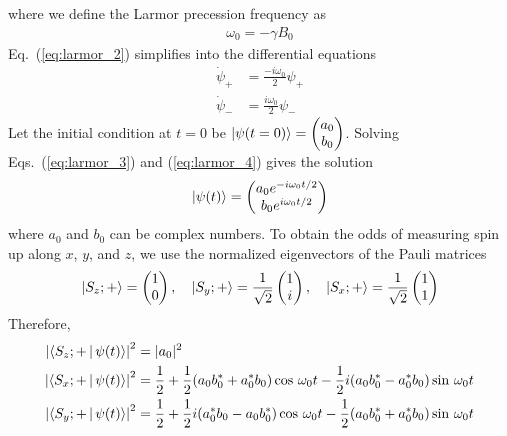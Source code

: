 where we define the Larmor precession frequency as
%
\begin{gather}
    \omega_0 = -\gamma B_0 \label{eq:larmor_freq}
\end{gather}
%
Eq.~(\ref{eq:larmor_2}) simplifies into the differential equations
%
\begin{align}
    \dot{\psi}_+ &=\frac{-i\omega_0}{2}\psi_+ \label{eq:larmor_3}\\
    \dot{\psi}_- &=\frac{i\omega_0}{2}\psi_- \label{eq:larmor_4}
\end{align}
%
Let the initial condition at $t=0$ be 
$\Ket{\psi(t=0)}=\left( \begin{matrix}
    a_0 \\
    b_0
\end{matrix}\right)$. Solving Eqs.~(\ref{eq:larmor_3}) and (\ref{eq:larmor_4}) gives the solution
%
\begin{gather}
    \ket{\psi(t)}=\left(\begin{matrix}
        a_0e^{-i\omega_0 t/2} \\
        b_0e^{i\omega_0 t/2}
    \end{matrix}\right)\label{eq:larmor_solution}
\end{gather}
%
where $a_0$ and $b_0$ can be complex numbers. To obtain the odds of measuring spin up along $x$, $y$, and $z$, we use the normalized eigenvectors of the Pauli matrices
%
\begin{gather}
    \Ket{S_z;+}=\left(\begin{matrix}
        1 \\
        0
    \end{matrix}\right),\quad
    \Ket{S_y;+}=\frac{1}{\sqrt{2}}\left(\begin{matrix}
        1 \\
        i
    \end{matrix}\right),\quad
    \Ket{S_x;+}=\frac{1}{\sqrt{2}}\left(\begin{matrix}
        1 \\
        1
    \end{matrix}\right)\label{eq:pauli_eigenvectors}
\end{gather}
%
Therefore,
%
\begin{align}
    \left| \Braket{S_z;+ | \psi(t)} \right|^2&= |a_0|^2 \\
    \left| \Braket{S_x;+ | \psi(t)} \right|^2&= \frac{1}{2} + \frac{1}{2}(a_0b_0^*+a_0^*b_0)\cos\,\omega_0t - \frac{1}{2}i(a_0b_0^*-a_0^*b_0)\sin\,\omega_0t \label{eq:larmor_5} \\
    \left| \Braket{S_y;+ | \psi(t)} \right|^2&= \frac{1}{2} + \frac{1}{2}i(a_0^*b_0-a_0b_0^*)\cos\,\omega_0t - \frac{1}{2}(a_0b_0^*+a_0^*b_0)\sin\,\omega_0t \label{eq:larmor_6}
\end{align}
